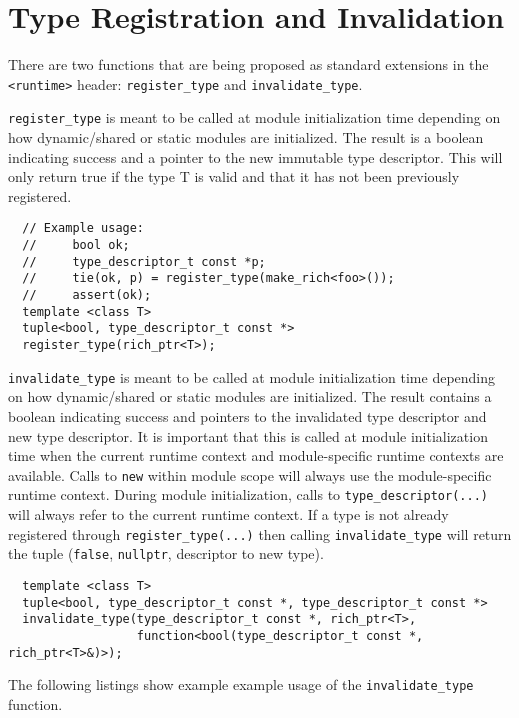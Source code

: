 \section{Type Registration and Invalidation}
\label{appendix:type-registration-invalidation}

There are two functions that are being proposed as standard extensions in the
\verb+<runtime>+ header: \verb+register_type+ and \verb+invalidate_type+.

\verb+register_type+ is meant to be called at module initialization time
depending on how dynamic/shared or static modules are initialized.  The result
is a boolean indicating success and a pointer to the new immutable type
descriptor. This will only return true if the type T is valid and that it has
not been previously registered.

\begin{verbatim}
  // Example usage:
  //     bool ok;
  //     type_descriptor_t const *p;
  //     tie(ok, p) = register_type(make_rich<foo>());
  //     assert(ok);
  template <class T>
  tuple<bool, type_descriptor_t const *>
  register_type(rich_ptr<T>);
\end{verbatim}

\verb+invalidate_type+ is meant to be called at module initialization time
depending on how dynamic/shared or static modules are initialized.
The result contains a boolean indicating success and pointers to the
invalidated type descriptor and new type descriptor. It is important
that this is called at module initialization time when the current
runtime context and module-specific runtime contexts are available.
Calls to \verb+new+ within module scope will always use the
module-specific runtime context. During module initialization, calls
to \verb+type_descriptor(...)+ will always refer to the current runtime
context. If a type is not already registered through
\verb+register_type(...)+ then calling \verb+invalidate_type+ will return the tuple
(\verb+false+, \verb+nullptr+, descriptor to new type).

\begin{verbatim}
  template <class T>
  tuple<bool, type_descriptor_t const *, type_descriptor_t const *>
  invalidate_type(type_descriptor_t const *, rich_ptr<T>,
                  function<bool(type_descriptor_t const *, rich_ptr<T>&)>);
\end{verbatim}

The following listings show example example usage of the \verb+invalidate_type+
function.

